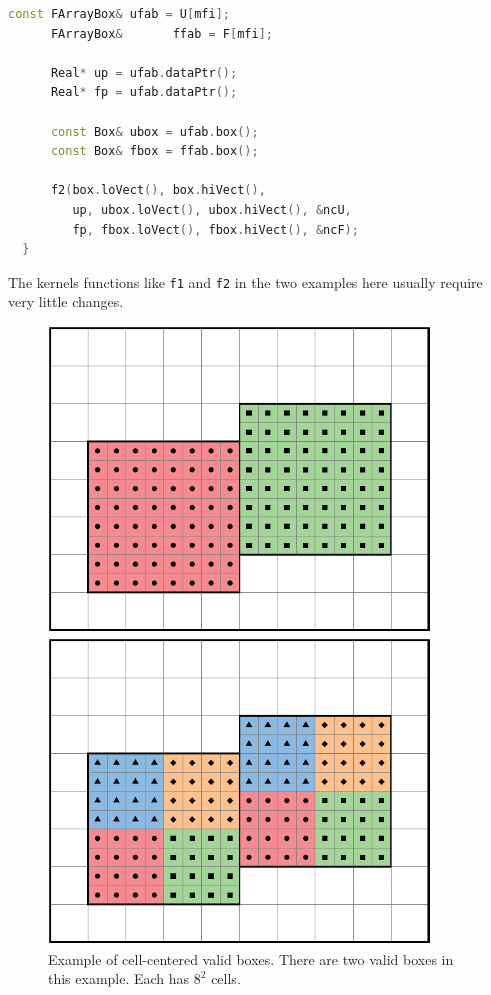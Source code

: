 {{{\begin{lstlisting}[language=cpp]
      const FArrayBox& ufab = U[mfi];
      FArrayBox&       ffab = F[mfi];

      Real* up = ufab.dataPtr();
      Real* fp = ufab.dataPtr();

      const Box& ubox = ufab.box();
      const Box& fbox = ffab.box();

      f2(box.loVect(), box.hiVect(),
         up, ubox.loVect(), ubox.hiVect(), &ncU,
         fp, fbox.loVect(), fbox.hiVect(), &ncF);
  }
\end{lstlisting}
The kernels functions like {\tt f1} and {\tt f2} in the two examples
here usually require very little changes.

\begin{figure}
  \centering
  \begin{minipage}{0.45\textwidth}
    \centering
    \includegraphics[width=0.9\textwidth]{./Basics/cc_validbox.pdf}
    \caption{\label{fig:basics:cc_validbox} Example of cell-centered valid boxes. There are two
    valid boxes in this example. Each has $8^2$ cells.}
  \end{minipage}\hfill
  \begin{minipage}{0.45\textwidth}
    \centering
    \includegraphics[width=0.9\textwidth]{./Basics/cc_tilebox.pdf}

\end{minipage}
\end{figure}}}}

